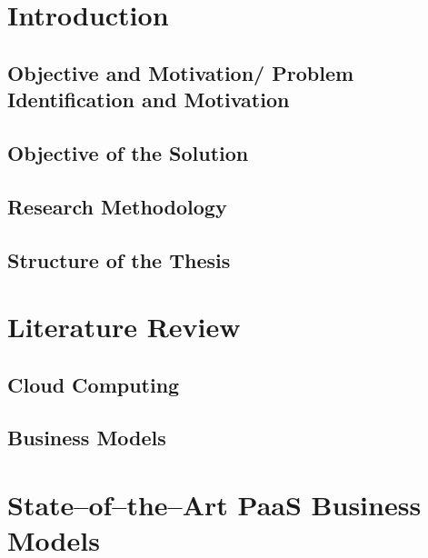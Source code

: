 \chapter{Introduction}

	\section{Objective and Motivation/ Problem Identification and Motivation}
	
	\section{Objective of the Solution}

	\section{Research Methodology}
	
	\section{Structure of the Thesis}

\chapter{Literature Review}

	\section{Cloud Computing}

	\section{Business Models}

\chapter{State--of--the--Art PaaS Business Models}

